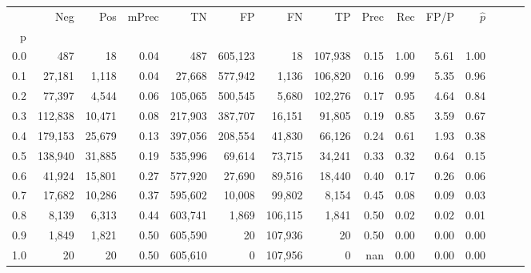 \begin{tabular}{rrrrrrrrrrrrrrr}
\toprule
{} &      Neg &     Pos & mPrec &       TN &       FP &       FN &       TP &  Prec &   Rec &  FP/P & $\hat{p}$ \\
p   &          &         &       &          &          &          &          &       &       &       &           \\
\midrule
0.0 &      487 &      18 &  0.04 &      487 &  605,123 &       18 &  107,938 &  0.15 &  1.00 &  5.61 &      1.00 \\
0.1 &   27,181 &   1,118 &  0.04 &   27,668 &  577,942 &    1,136 &  106,820 &  0.16 &  0.99 &  5.35 &      0.96 \\
0.2 &   77,397 &   4,544 &  0.06 &  105,065 &  500,545 &    5,680 &  102,276 &  0.17 &  0.95 &  4.64 &      0.84 \\
0.3 &  112,838 &  10,471 &  0.08 &  217,903 &  387,707 &   16,151 &   91,805 &  0.19 &  0.85 &  3.59 &      0.67 \\
0.4 &  179,153 &  25,679 &  0.13 &  397,056 &  208,554 &   41,830 &   66,126 &  0.24 &  0.61 &  1.93 &      0.38 \\
0.5 &  138,940 &  31,885 &  0.19 &  535,996 &   69,614 &   73,715 &   34,241 &  0.33 &  0.32 &  0.64 &      0.15 \\
0.6 &   41,924 &  15,801 &  0.27 &  577,920 &   27,690 &   89,516 &   18,440 &  0.40 &  0.17 &  0.26 &      0.06 \\
0.7 &   17,682 &  10,286 &  0.37 &  595,602 &   10,008 &   99,802 &    8,154 &  0.45 &  0.08 &  0.09 &      0.03 \\
0.8 &    8,139 &   6,313 &  0.44 &  603,741 &    1,869 &  106,115 &    1,841 &  0.50 &  0.02 &  0.02 &      0.01 \\
0.9 &    1,849 &   1,821 &  0.50 &  605,590 &       20 &  107,936 &       20 &  0.50 &  0.00 &  0.00 &      0.00 \\
1.0 &       20 &      20 &  0.50 &  605,610 &        0 &  107,956 &        0 &   nan &  0.00 &  0.00 &      0.00 \\
\bottomrule
\end{tabular}

